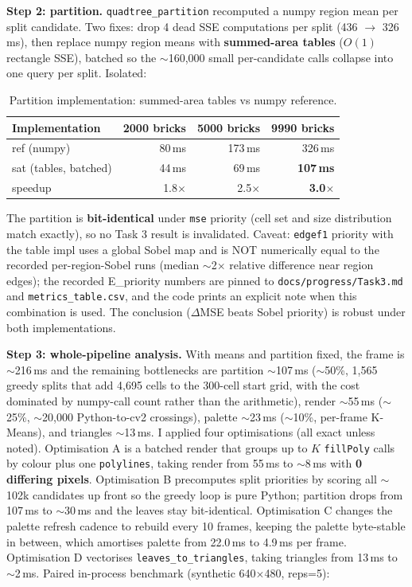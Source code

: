 \documentclass[11pt,a4paper]{article}
\begin{document}
\textbf{Step 2: partition.} \texttt{quadtree\_partition} recomputed a numpy
region mean per split candidate. Two fixes: drop 4 dead SSE computations per
split (436 $\rightarrow$ 326\,ms), then replace numpy region means with
\textbf{summed-area tables} ($O(1)$ rectangle SSE), batched so the $\sim$160{,}000
small per-candidate calls collapse into one query per split. Isolated:

\begin{table}[htbp]
\centering
\begin{tabular}{@{}l r r r@{}}
\toprule
\textbf{Implementation} & \textbf{2000 bricks} & \textbf{5000 bricks} & \textbf{9990 bricks}\\
\midrule
ref (numpy)           & 80\,ms & 173\,ms & 326\,ms \\
sat (tables, batched) & 44\,ms & 69\,ms  & \textbf{107\,ms} \\
speedup               & 1.8$\times$ & 2.5$\times$ & \textbf{3.0$\times$} \\
\bottomrule
\end{tabular}
\caption{Partition implementation: summed-area tables vs numpy reference.}
\label{tab:partition}
\end{table}

The partition is \textbf{bit-identical} under \texttt{mse} priority (cell set and
size distribution match exactly), so no Task 3 result is invalidated. Caveat:
\texttt{edgef1} priority with the table impl uses a global Sobel map and is NOT
numerically equal to the recorded per-region-Sobel runs (median $\sim$2$\times$
relative difference near region edges); the recorded E\_priority numbers are
pinned to \texttt{docs/progress/Task3.md} and \texttt{metrics\_table.csv}, and
the code prints an explicit note when this combination is used. The conclusion
($\Delta$MSE beats Sobel priority) is robust under both implementations.

\textbf{Step 3: whole-pipeline analysis.} With means and partition fixed, the
frame is $\sim$216\,ms and the remaining bottlenecks are partition $\sim$107\,ms
($\sim$50\%, 1{,}565 greedy splits that add 4{,}695 cells to the 300-cell start
grid, with the cost dominated by numpy-call count rather than the arithmetic),
render $\sim$55\,ms ($\sim$25\%, $\sim$20{,}000 Python-to-cv2 crossings), palette
$\sim$23\,ms ($\sim$10\%, per-frame K-Means), and triangles $\sim$13\,ms. I
applied four optimisations (all exact unless noted). Optimisation A is a batched
render that groups up to $K$ \texttt{fillPoly} calls by colour plus one
\texttt{polylines}, taking render from 55\,ms to $\sim$8\,ms with \textbf{0
differing pixels}. Optimisation B precomputes split priorities by scoring all
$\sim$102k candidates up front so the greedy loop is pure Python; partition
drops from 107\,ms to $\sim$30\,ms and the leaves stay bit-identical.
Optimisation C changes the palette refresh cadence to rebuild every 10 frames,
keeping the palette byte-stable in between, which amortises palette from
22.0\,ms to 4.9\,ms per frame. Optimisation D vectorises
\texttt{leaves\_to\_triangles}, taking triangles from 13\,ms to $\sim$2\,ms.
Paired in-process benchmark (synthetic 640$\times$480, reps=5):
\end{document}
